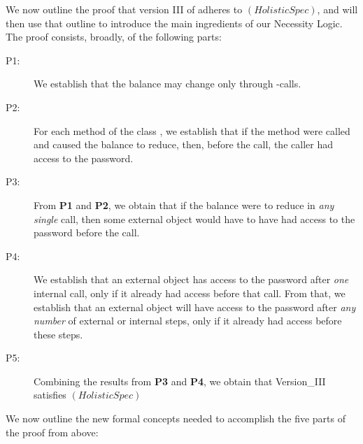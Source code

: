 We  now outline the proof that version III of  adheres to $(HolisticSpec)$,
and  will then use that outline to 
 introduce the main ingredients of our Necessity Logic. The proof consists,
broadly, of the following parts:

\begin{description}
\item[P1:] We establish that the balance 
 may change only   through -\internalC calls.  

\item[P2:] 
For each method of the class  ,  we establish that   
if the method were called and  caused the  balance to reduce, then, before the call,
the caller had access  to the password.

\item[P3:]  
From \textbf{P1} and \textbf{P2}, we obtain that if the balance were to 
reduce in \emph{any}  \emph{single} call, then some
external object would have to have had access to the password before the call.

\item[P4:] We establish %
that   an external object has access to 
the password after \emph{one} internal call, only if it already had access before that call.
From that, we establish  that  an external object will have access to 
the password after \emph{any number} of external or internal 
steps, only if it already had access before these steps.

\item[P5:] Combining  the results from \textbf{P3} and \textbf{P4}, we obtain
that  Version\_III satisfies $(HolisticSpec)$

\end{description} 
 
We  now outline  the new formal concepts needed to accomplish the five parts of the proof from above:

